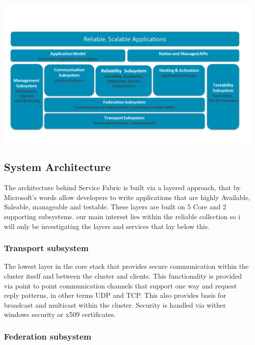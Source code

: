 \documentclass[a4paper,10pt,titlepage]{report}
\begin{document}
    \includegraphics[scale=0.5]{images/service-fabric-architecture.png}

    \subsection{System Architecture}

    The architecture behind Service Fabric is built via a layered approach, that by Microsoft's words allow developers to write applications that are highly Available, Saleable, manageable and testable. These layers are built on 5 Core and 2 supporting subsystems. our main interest lies within the reliable collection so i will only be investigating the layers and services that lay below this.\\
    \vspace{5mm}

    \subsubsection{Transport subsystem}
    The lowest layer in the core stack that provides secure communication within the cluster itself and between the cluster and clients. This functionality is provided via point to point communication channels that support one way and request reply patterns, in other terms UDP and TCP. This also provides basis for broadcast and multicast within the cluster. Security is handled via wither windows security or x509 certificates. \\
    \vspace{5mm}

    \subsubsection{Federation subsystem}
\end{document}
